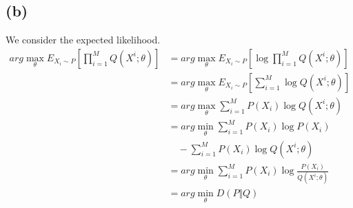 \documentclass{article}
\begin{document}
\subsection*{(b)}
We consider the expected likelihood.
\begin{equation}
    \begin{split}
        arg\max_{\theta}E_{X_i \sim P}[\prod_{i=1}^{M}Q(X^{i};\theta)]
        &= arg\max_{\theta}E_{X_i \sim P}[\log \prod_{i=1}^{M}Q(X^{i};\theta)]\\
        &= arg\max_{\theta}E_{X_i \sim P}[\sum_{i=1}^{M}\log Q(X^{i};\theta)] \\
        &= arg\max_{\theta} \sum_{i=1}^{M}P(X_i)\log Q(X^{i};\theta)\\
        &= arg\min_{\theta} \sum_{i=1}^{M}P(X_i)\log P(X_i)\\
        &\quad -\sum_{i=1}^{M}P(X_i)\log Q(X^{i};\theta)\\
        &= arg\min_{\theta} \sum_{i=1}^{M}P(X_i)\log \frac{P(X_i)}{Q(X^{i};\theta)}\\
        &= arg\min_{\theta} D(P\Vert Q)
    \end{split}
\end{equation}
\end{document}
